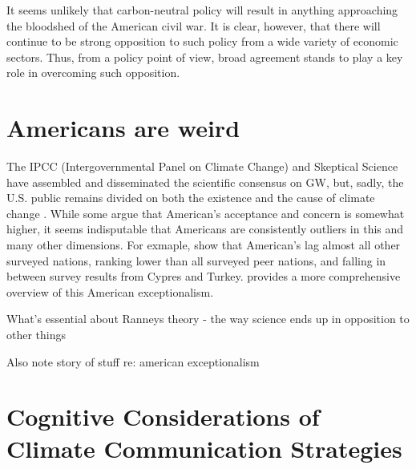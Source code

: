 It seems unlikely that carbon-neutral policy will result in anything
approaching the bloodshed of the American civil war. It is clear, however, that
there will continue to be strong opposition to such policy from a wide variety
of economic sectors. Thus, from a policy point of view, broad agreement stands
to play a key role in overcoming such opposition.

\section{Americans are weird}

The IPCC (Intergovernmental Panel on Climate Change) and Skeptical Science have
assembled and disseminated the scientific consensus on GW, but, sadly, the U.S.
public remains divided on both the existence and the cause of climate change
\parencite[cf.][]{hoffman_growing_2011}. While some
\parencite[e.g.,][]{krosnick} argue that American's acceptance and concern is
somewhat higher, it seems indisputable that Americans are consistently outliers
in this and many other dimensions. For exmaple, \textcite{lieserowicz} show that
American's lag almost all other surveyed nations, ranking lower than all
surveyed peer nations, and falling in between survey results from Cypres and
Turkey. \textcite{ranney_why_2012} provides a more comprehensive overview of
this American exceptionalism.

What's essential about Ranneys theory - the way science ends up in opposition to
other things

Also note story of stuff re: american exceptionalism

\textcite{shtulman-evo-2010-ish}


\section{Cognitive Considerations of Climate Communication Strategies}

